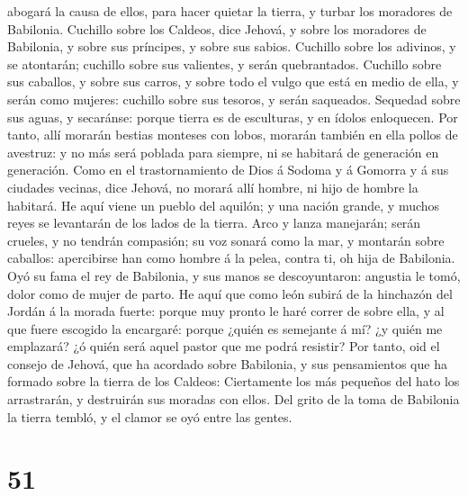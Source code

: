 abogará la causa de ellos, para hacer quietar la tierra, y turbar los
moradores de Babilonia.  Cuchillo sobre los Caldeos, dice
Jehová, y sobre los moradores de Babilonia, y sobre sus príncipes, y
sobre sus sabios.  Cuchillo sobre los adivinos, y se
atontarán; cuchillo sobre sus valientes, y serán quebrantados.
 Cuchillo sobre sus caballos, y sobre sus carros, y sobre
todo el vulgo que está en medio de ella, y serán como mujeres: cuchillo
sobre sus tesoros, y serán saqueados.  Sequedad sobre sus
aguas, y secaránse: porque tierra es de esculturas, y en ídolos
enloquecen.  Por tanto, allí morarán bestias monteses con
lobos, morarán también en ella pollos de avestruz: y no más será poblada
para siempre, ni se habitará de generación en generación. 
Como en el trastornamiento de Dios á Sodoma y á Gomorra y á sus ciudades
vecinas, dice Jehová, no morará allí hombre, ni hijo de hombre la
habitará.  He aquí viene un pueblo del aquilón; y una
nación grande, y muchos reyes se levantarán de los lados de la tierra.
 Arco y lanza manejarán; serán crueles, y no tendrán
compasión; su voz sonará como la mar, y montarán sobre caballos:
apercibirse han como hombre á la pelea, contra ti, oh hija de Babilonia.
 Oyó su fama el rey de Babilonia, y sus manos se
descoyuntaron: angustia le tomó, dolor como de mujer de parto.
 He aquí que como león subirá de la hinchazón del Jordán á
la morada fuerte: porque muy pronto le haré correr de sobre ella, y al
que fuere escogido la encargaré: porque ¿quién es semejante á mí? ¿y
quién me emplazará? ¿ó quién será aquel pastor que me podrá resistir?
 Por tanto, oid el consejo de Jehová, que ha acordado sobre
Babilonia, y sus pensamientos que ha formado sobre la tierra de los
Caldeos: Ciertamente los más pequeños del hato los arrastrarán, y
destruirán sus moradas con ellos.  Del grito de la toma de
Babilonia la tierra tembló, y el clamor se oyó entre las gentes.

\hypertarget{section-50}{%
\section{51}\label{section-50}}

